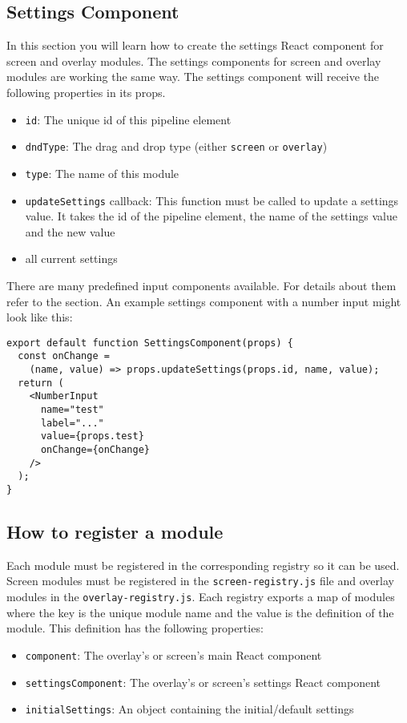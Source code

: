 \subsection{Settings Component}
\label{sec:settings-component}
In this section you will learn how to create the settings React component for screen and overlay modules.
The settings components for screen and overlay modules are working the same way. 
The settings component will receive the following properties in its props.
\begin{itemize}
  \item \texttt{id}: The unique id of this pipeline element
  \item \texttt{dndType}: The drag and drop type (either \texttt{screen} or \texttt{overlay})
  \item \texttt{type}: The name of this module
  \item \texttt{updateSettings} callback: This function must be called to update a settings value. 
    It takes the id of the pipeline element, the name of the settings value and the new value
  \item all current settings
\end{itemize}

There are many predefined input components available. 
For details about them refer to the  section. 
An example settings component with a number input might look like this:
\begin{verbatim}
export default function SettingsComponent(props) {
  const onChange = 
    (name, value) => props.updateSettings(props.id, name, value);
  return (
    <NumberInput 
      name="test" 
      label="..." 
      value={props.test} 
      onChange={onChange} 
    />
  );
}
\end{verbatim}

\subsection{How to register a module}
Each module must be registered in the corresponding registry so it can be used. 
Screen modules must be registered in the \texttt{screen-registry.js} file and overlay modules in the \texttt{overlay-registry.js}. 
Each registry exports a map of modules where the key is the unique module name and the value is the definition of the module. 
This definition has the following properties:
\begin{itemize}
  \item \texttt{component}: The overlay's or screen's main React component
  \item \texttt{settingsComponent}: The overlay's or screen's settings React component
  \item \texttt{initialSettings}: An object containing the initial/default settings
\end{itemize}


